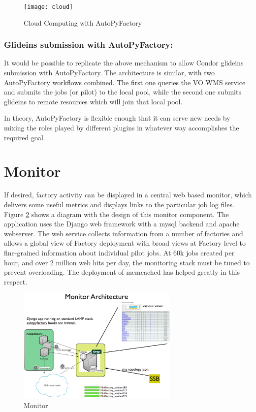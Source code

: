 \documentclass[a4paper]{jpconf}
\begin{document}
\begin{figure}[h]
\centering\texttt{[image: cloud]}
\caption{Cloud Computing with AutoPyFactory}
\label{cloud}
\end{figure}

\subsubsection{Glideins submission with AutoPyFactory:}
It would be possible to replicate the above mechanism to allow Condor glideins submission with AutoPyFactory.
The architecture is similar, with two AutoPyFactory workflows combined.
The first one queries the VO WMS service and submits the jobs (or pilot) to the local pool, 
while the second one submits glideins to remote resources which will join that local pool. 

In theory, AutoPyFactory is flexible enough that it can serve new needs by mixing the
roles played by different plugins in whatever way accomplishes the required goal. 

\section{Monitor}

If desired, factory activity can be displayed in a central web based monitor,
which delivers some useful metrics and displays links to the particular job log
files. Figure \ref{monitor} shows a diagram with the design of this monitor component.
The application uses the Django web framework with a mysql backend and apache webserver. 
The web service collects information from a number of
factories and allows a global view of Factory deployment with broad
views at Factory level to fine-grained information about individual pilot jobs. 
At 60k jobs created per hour, and over 2 million web hits per day, 
the monitoring stack must be tuned to prevent overloading.
The deployment of memcached has helped greatly in this respect.


\begin{figure}[h]
\centering\includegraphics[width=0.7\textwidth]{monitor}
\caption{Monitor}
\label{monitor}
\end{figure}
\end{document}
